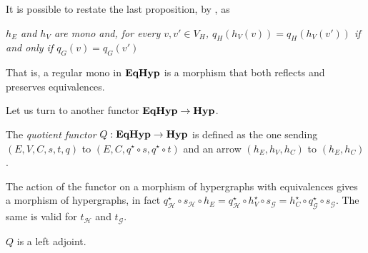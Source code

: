 \documentclass[a4paper,UKenglish,cleveref,pdftex,thm-restate,numberwithinsect]{lipics-v2021}
\newcommand{\catname}[1]{\textbf{\textup{#1}}}
\newcommand{\hyp}{\catname{Hyp}}
\newcommand{\EqHyp}{\catname{EqHyp}} %
\begin{document}
\begin{remark}
	It is possible to restate the last proposition, by , as 
	\begin{displayquote}
		\textit{$h_E$ and $h_V$ are mono and, for every $v, v'\in V_H$, $q_H(h_V(v))=q_H(h_V(v'))$ if and only if $q_G(v)=q_G(v')$}
	\end{displayquote}
	That is, a regular mono in $\EqHyp$ is a morphism that both reflects and preserves equivalences.
\end{remark}
\fi 


Let us turn to another functor $\EqHyp \to \hyp$.

\begin{definition}
	The \emph{quotient functor} $Q:\EqHyp\to \hyp $ is defined as
	the one sending $(E, V, C, s, t, q)$ to $(E, C, q^{\star}\circ s, q^{\star}\circ t)$ and an arrow $(h_E, h_V, h_C)$ to $(h_E, h_C)$.
\end{definition}

\begin{remark}
	The action of the functor on a morphism of hypergraphs with equivalences gives a morphism of hypergraphs,
	in fact $q^{\star}_\mathcal{H} \circ s_\mathcal{H} \circ h_E = q^{\star}_\mathcal{H} \circ h_V^\star \circ s_\mathcal{G} = h_C^\star \circ q^{\star}_\mathcal{G} \circ s_\mathcal{G}$.
	The same is valid for $t_\mathcal{H}$ and $t_\mathcal{G}$. 
\end{remark}

\begin{lemma}\label{lemma:quot_funct_left_adj}
	$Q$ is a left adjoint.
\end{lemma}
\end{document}
